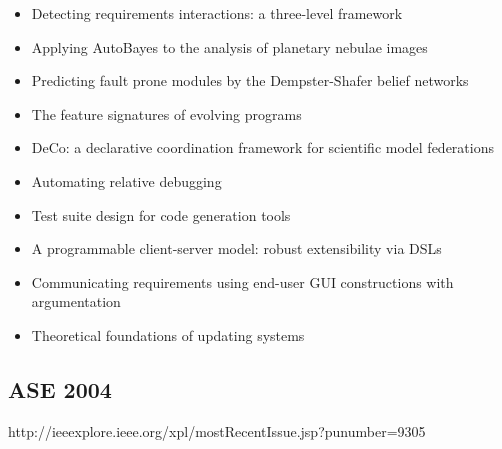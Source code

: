 {\begin{itemize}[itemsep=-1ex]
  \item Detecting requirements interactions: a three-level framework
  \item Applying AutoBayes to the analysis of planetary nebulae images
  \item Predicting fault prone modules by the Dempster-Shafer belief networks
  \item The feature signatures of evolving programs
  \item DeCo: a declarative coordination framework for scientific model federations
  \item Automating relative debugging
  \item Test suite design for code generation tools
  \item A programmable client-server model: robust extensibility via DSLs
  \item Communicating requirements using end-user GUI constructions with argumentation
  \item Theoretical foundations of updating systems
\end{itemize}
}

\subsection{ASE 2004}

http://ieeexplore.ieee.org/xpl/mostRecentIssue.jsp?punumber=9305

